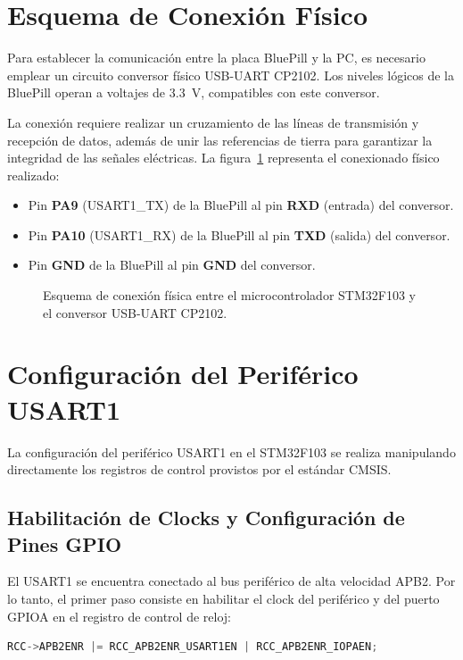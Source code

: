 \section{Esquema de Conexión Físico}

Para establecer la comunicación entre la placa BluePill y la PC, es necesario emplear un circuito conversor físico
USB-UART CP2102. Los niveles lógicos de la BluePill operan a voltajes de \qty{3.3}{\V}, compatibles con este conversor.

La conexión requiere realizar un cruzamiento de las líneas de transmisión y recepción de datos, además de unir las
referencias de tierra para garantizar la integridad de las señales eléctricas. La figura~\ref{fig:conexion_uart}
representa el conexionado físico realizado:
\begin{itemize}
  \item Pin \textbf{PA9} (USART1\_TX) de la BluePill al pin \textbf{RXD} (entrada) del conversor.
  \item Pin \textbf{PA10} (USART1\_RX) de la BluePill al pin \textbf{TXD} (salida) del conversor.
  \item Pin \textbf{GND} de la BluePill al pin \textbf{GND} del conversor.
\end{itemize}

\begin{figure}[!ht]
  \centering
  
  \caption{Esquema de conexión física entre el microcontrolador STM32F103 y el conversor USB-UART CP2102.}
  \label{fig:conexion_uart}
\end{figure}

\section{Configuración del Periférico USART1}

La configuración del periférico USART1 en el STM32F103 se realiza manipulando directamente los registros de control
provistos por el estándar CMSIS.

\subsection{Habilitación de Clocks y Configuración de Pines GPIO}
El USART1 se encuentra conectado al bus periférico de alta velocidad APB2. Por lo tanto, el primer paso consiste en
habilitar el clock del periférico y del puerto GPIOA en el registro de control de reloj:
\begin{lstlisting}[language=C]
RCC->APB2ENR |= RCC_APB2ENR_USART1EN | RCC_APB2ENR_IOPAEN;
\end{lstlisting}

